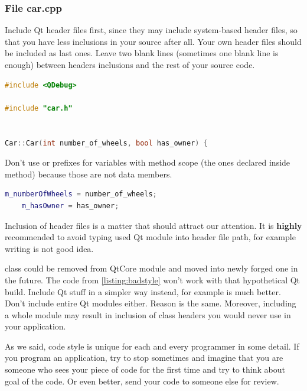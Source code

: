 \subsubsection*{File car.cpp}
Include Qt header files first, since they may include system-based header files, so that you have less inclusions in your source after all. Your own header files should be included as last ones. Leave two blank lines (sometimes one blank line is enough) between headers inclusions and the rest of your source code.
\begin{lstlisting}[firstnumber=1,language=cpp]
#include <QDebug>

#include "car.h"


Car::Car(int number_of_wheels, bool has_owner) {
\end{lstlisting}
Don't use or prefixes for variables with method scope (the ones declared inside method) because those are not data members.
\begin{lstlisting}[firstnumber=6,language=cpp]
    m_numberOfWheels = number_of_wheels;
    m_hasOwner = has_owner;
\end{lstlisting}

\begin{fdocextra}
Inclusion of header files is a matter that should attract our attention. It is \textbf{highly} recommended to avoid typing used Qt module into header file path, for example writing is not good idea.

 class could be removed from QtCore module and moved into newly forged one in the future.\footnotemark{} The code from \autoref{listing:badstyle} won't work with that hypothetical Qt build. Include Qt stuff in a simpler way instead, for example is much better. Don't include entire Qt modules either. Reason is the same. Moreover, including a whole module may result in inclusion of class headers you would never use in your application.
\end{fdocextra}

As we said, code style is unique for each and every programmer in some detail. If you program an application, try to stop sometimes and imagine that you are someone who sees your piece of code for the first time and try to think about goal of the code. Or even better, send your code to someone else for review.